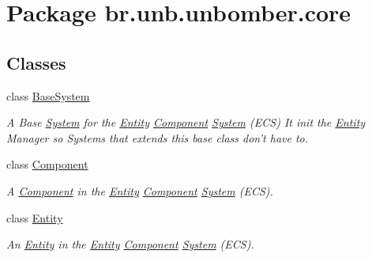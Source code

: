 \hypertarget{namespacebr_1_1unb_1_1unbomber_1_1core}{\section{Package br.\+unb.\+unbomber.\+core}
\label{namespacebr_1_1unb_1_1unbomber_1_1core}
}
\subsection*{Classes}
\begin{DoxyCompactItemize}
\item 
class \hyperlink{classbr_1_1unb_1_1unbomber_1_1core_1_1_base_system}{Base\+System}
\begin{DoxyCompactList}\small\item\em A Base \hyperlink{interfacebr_1_1unb_1_1unbomber_1_1core_1_1_system}{System} for the \hyperlink{classbr_1_1unb_1_1unbomber_1_1core_1_1_entity}{Entity} \hyperlink{classbr_1_1unb_1_1unbomber_1_1core_1_1_component}{Component} \hyperlink{interfacebr_1_1unb_1_1unbomber_1_1core_1_1_system}{System} (E\+C\+S) It init the \hyperlink{classbr_1_1unb_1_1unbomber_1_1core_1_1_entity}{Entity} Manager so Systems that extends this base class don't have to. \end{DoxyCompactList}\item 
class \hyperlink{classbr_1_1unb_1_1unbomber_1_1core_1_1_component}{Component}
\begin{DoxyCompactList}\small\item\em A \hyperlink{classbr_1_1unb_1_1unbomber_1_1core_1_1_component}{Component} in the \hyperlink{classbr_1_1unb_1_1unbomber_1_1core_1_1_entity}{Entity} \hyperlink{classbr_1_1unb_1_1unbomber_1_1core_1_1_component}{Component} \hyperlink{interfacebr_1_1unb_1_1unbomber_1_1core_1_1_system}{System} (E\+C\+S). \end{DoxyCompactList}\item 
class \hyperlink{classbr_1_1unb_1_1unbomber_1_1core_1_1_entity}{Entity}
\begin{DoxyCompactList}\small\item\em An \hyperlink{classbr_1_1unb_1_1unbomber_1_1core_1_1_entity}{Entity} in the \hyperlink{classbr_1_1unb_1_1unbomber_1_1core_1_1_entity}{Entity} \hyperlink{classbr_1_1unb_1_1unbomber_1_1core_1_1_component}{Component} \hyperlink{interfacebr_1_1unb_1_1unbomber_1_1core_1_1_system}{System} (E\+C\+S). \end{DoxyCompactList}\item 

\end{DoxyCompactItemize}
